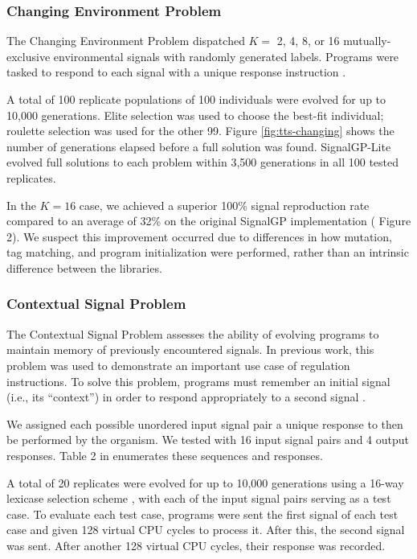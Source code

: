 \subsubsection{Changing Environment Problem}

The Changing Environment Problem dispatched $K =$ 2, 4, 8, or 16 mutually-exclusive environmental signals with randomly generated labels.
Programs were tasked to respond to each signal with a unique response instruction \citep{lalejini2018evolving}.

A total of 100 replicate populations of 100 individuals were evolved for up to 10,000 generations.
Elite selection was used to choose the best-fit individual; roulette selection was used for the other 99.
Figure \ref{fig:tts-changing} shows the number of generations elapsed before a full solution was found.
SignalGP-Lite evolved full solutions to each problem within 3,500 generations in all 100 tested replicates.

In the $K=16$ case, we achieved a superior 100\% signal reproduction rate compared to an average of 32\% on the original SignalGP  implementation  (\citep{lalejini2018evolving} Figure 2).
We suspect this improvement occurred due to differences in how mutation, tag matching, and program initialization were performed, rather than an intrinsic difference between the libraries.

\subsubsection{Contextual Signal Problem}

The Contextual Signal Problem assesses the ability of evolving programs to maintain memory of previously encountered signals.
In previous work, this problem was used to demonstrate an important use case of regulation instructions.
To solve this problem, programs must remember an initial signal (i.e., its ``context'') in order to respond appropriately to a second signal \citep{lalejini_tag-based_2021}.

We assigned each possible unordered input signal pair a unique response to then be performed by the organism.
We tested with 16 input signal pairs and 4 output responses.
Table 2 in \citep{lalejini_tag-based_2021} enumerates these sequences and responses.

A total of 20 replicates were evolved for up to 10,000 generations using a 16-way lexicase selection scheme \citep{spector2012assessment}, with each of the input signal pairs serving as a test case.
To evaluate each test case, programs were sent the first signal of each test case and given 128 virtual CPU cycles to process it.
After this, the second signal was sent.
After another 128 virtual CPU cycles, their response was recorded.

